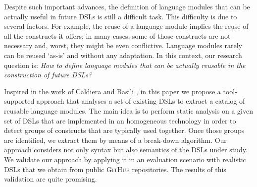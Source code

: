 Despite such important advances, the definition of language modules that can be actually useful in future DSLs is still a difficult task. This difficulty is due to several factors. For example, the reuse of a language module implies the reuse of all the constructs it offers; in many cases, some of those constructs are not necessary and, worst, they might be even conflictive. Language modules rarely can be reused `as-is' and without any adaptation. In this context, our research question is: \textit{How to define language modules that can be actually reusable in the construction of future DSLs?} %

Inspired in the work of Caldiera and Basili \cite{Caldiera:1991}, in this paper we propose a tool-supported approach that analyses a set of existing DSLs to extract a catalog of reusable language modules. The main idea is to perform static analysis on a given set of DSLs that are implemented in an homogeneous technology in order to detect groups of constructs that are typically used together. Once those groups are identified, we extract them by means of a break-down algorithm. Our approach considers not only syntax but also semantics of the DSLs under study. We validate our approach by applying it in an evaluation scenario with realistic DSLs that we obtain from public \textsc{GitHub} repositories. The results of this validation are quite promising.


